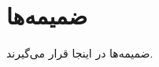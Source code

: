 \documentclass{article}[a4paper, 11px]
\begin{document}
\section{
ضمیمه‌ها
}

ضمیمه‌ها در اینجا قرار می‌گیرند.
\end{document}
